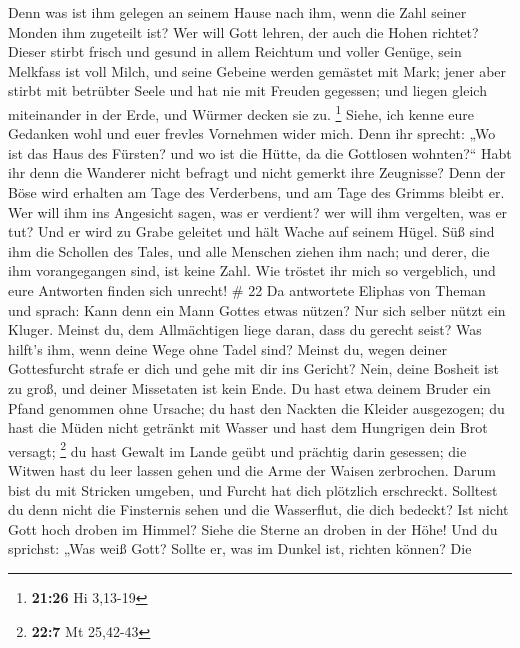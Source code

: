 Denn was ist ihm gelegen an seinem Hause nach ihm, wenn die Zahl seiner
Monden ihm zugeteilt ist?  Wer will Gott lehren, der auch
die Hohen richtet?  Dieser stirbt frisch und gesund in
allem Reichtum und voller Genüge,  sein Melkfass ist voll
Milch, und seine Gebeine werden gemästet mit Mark;  jener
aber stirbt mit betrübter Seele und hat nie mit Freuden gegessen;
 und liegen gleich miteinander in der Erde, und Würmer
decken sie zu. \footnote{\textbf{21:26} Hi 3,13-19}  Siehe,
ich kenne eure Gedanken wohl und euer frevles Vornehmen wider mich.
 Denn ihr sprecht: „Wo ist das Haus des Fürsten? und wo ist
die Hütte, da die Gottlosen wohnten?{}``  Habt ihr denn die
Wanderer nicht befragt und nicht gemerkt ihre Zeugnisse? 
Denn der Böse wird erhalten am Tage des Verderbens, und am Tage des
Grimms bleibt er.  Wer will ihm ins Angesicht sagen, was er
verdient? wer will ihm vergelten, was er tut?  Und er wird
zu Grabe geleitet und hält Wache auf seinem Hügel.  Süß
sind ihm die Schollen des Tales, und alle Menschen ziehen ihm nach; und
derer, die ihm vorangegangen sind, ist keine Zahl.  Wie
tröstet ihr mich so vergeblich, und eure Antworten finden sich unrecht!
\# 22  Da antwortete Eliphas von Theman und sprach:
 Kann denn ein Mann Gottes etwas nützen? Nur sich selber
nützt ein Kluger.  Meinst du, dem Allmächtigen liege daran,
dass du gerecht seist? Was hilft's ihm, wenn deine Wege ohne Tadel sind?
 Meinst du, wegen deiner Gottesfurcht strafe er dich und
gehe mit dir ins Gericht?  Nein, deine Bosheit ist zu groß,
und deiner Missetaten ist kein Ende.  Du hast etwa deinem
Bruder ein Pfand genommen ohne Ursache; du hast den Nackten die Kleider
ausgezogen;  du hast die Müden nicht getränkt mit Wasser und
hast dem Hungrigen dein Brot versagt; \footnote{\textbf{22:7} Mt
  25,42-43}  du hast Gewalt im Lande geübt und prächtig
darin gesessen;  die Witwen hast du leer lassen gehen und
die Arme der Waisen zerbrochen.  Darum bist du mit Stricken
umgeben, und Furcht hat dich plötzlich erschreckt. 
Solltest du denn nicht die Finsternis sehen und die Wasserflut, die dich
bedeckt?  Ist nicht Gott hoch droben im Himmel? Siehe die
Sterne an droben in der Höhe!  Und du sprichst: „Was weiß
Gott? Sollte er, was im Dunkel ist, richten können?  Die
